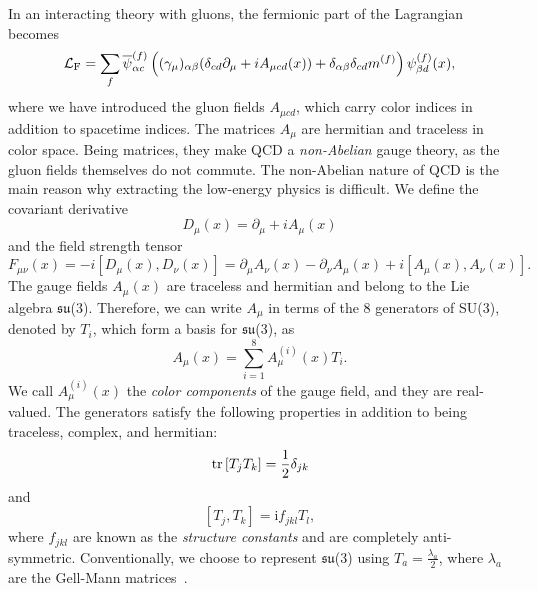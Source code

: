 In an interacting theory with gluons, the fermionic part of the Lagrangian becomes
\begin{equation}\label{eq:fermion_lagrangian}
    \mathcal L_{\rm F} = \sum_{f} \overline \psi^{(f)}_{\alpha c}\left((\gamma_\mu)_{\alpha\beta} (\delta_{cd}\partial_\mu + i A_{\mu c d}(x)) + \delta_{\alpha\beta}\delta_{cd} m^{(f)}\right)\psi^{(f)}_{\beta d}(x),
\end{equation}
where we have introduced the gluon fields $A_{\mu c d}$, which carry color indices in addition to spacetime indices. The matrices $A_\mu$ are hermitian and traceless in color space. Being matrices, they make QCD a \emph{non-Abelian} gauge theory, as the gluon fields themselves do not commute. The non-Abelian nature of QCD is the main reason why extracting the low-energy physics is difficult. We define the covariant derivative
\begin{equation}
    D_\mu(x) = \partial_\mu + i A_\mu(x)
\end{equation}
and the field strength tensor
\begin{equation}
    F_{\mu \nu}(x) = -i[D_\mu(x), D_\nu(x)] = \partial_\mu A_\nu(x) - \partial_\nu A_\mu(x) + i[A_\mu(x), A_\nu(x)].
\end{equation}
The gauge fields $A_\mu(x)$ are traceless and hermitian and belong to the Lie algebra $\mathfrak{su}$(3). Therefore, we can write $A_\mu$ in terms of the 8 generators of SU(3), denoted by $T_i$, which form a basis for $\mathfrak{su}$(3), as
\begin{equation}
    A_{\mu}(x)=\sum_{i=1}^{8} A_{\mu}^{(i)}(x) T_{i}.
\end{equation}
We call $A_{\mu}^{(i)}(x)$ the \emph{color components} of the gauge field, and they are real-valued. The generators satisfy the following properties in addition to being traceless, complex, and hermitian:
\begin{equation}
    \tr \left[T_{j} T_{k}\right]=\frac{1}{2} \delta_{j k}
\end{equation}
and
\begin{equation}
    \left[T_{j}, T_{k}\right]=\mathrm{i} f_{j k l} T_{l},
\end{equation}
where $f_{jkl}$ are known as the \emph{structure constants} and are completely anti-symmetric. Conventionally, we choose to represent $\mathfrak{su}$(3) using $T_a = \frac{\lambda_a}{2}$, where $\lambda_a$ are the Gell-Mann matrices~\cite{GellMann:1962xb}.

